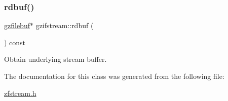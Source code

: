 \subsubsection{\texorpdfstring{rdbuf()}{rdbuf()}}
{\footnotesize\ttfamily \hyperlink{classgzfilebuf}{gzfilebuf}$\ast$ gzifstream\+::rdbuf (\begin{DoxyParamCaption}{ }\end{DoxyParamCaption}) const\hspace{0.3cm}{\ttfamily [inline]}}

Obtain underlying stream buffer. 

The documentation for this class was generated from the following file\+:\begin{DoxyCompactItemize}
\item 
\hyperlink{zfstream_8h}{zfstream.\+h}\end{DoxyCompactItemize}
